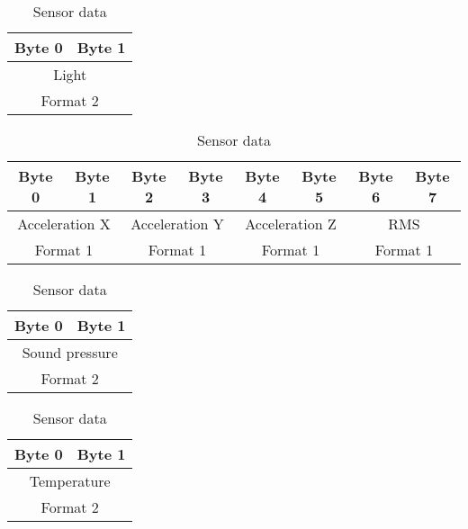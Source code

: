 \begin{table}[H]
    \centering
    {
    \begin{tabular}{|c c|}
        \hline
        \textbf{Byte 0} & \textbf{Byte 1}\\
        \hline
        \hline
        \multicolumn{2}{|c|}{Light}\\
        \multicolumn{2}{|c|}{Format 2}\\
        \hline
    \end{tabular}
    }
    \caption{Sensor data}
    \label{table:sensor6}
\end{table}

\begin{table}[H]
    \centering
    {
    \begin{tabular}{|c c c c c c c c|}
        \hline
        \textbf{Byte 0} & \textbf{Byte 1}  & \textbf{Byte 2} & \textbf{Byte 3} & \textbf{Byte 4} & \textbf{Byte 5} & \textbf{Byte 6} & \textbf{Byte 7}\\
        \hline
        \hline
        \multicolumn{2}{|c|}{Acceleration X} & \multicolumn{2}{|c|}{Acceleration Y}  & \multicolumn{2}{|c|}{Acceleration Z} & \multicolumn{2}{|c|}{RMS}\\
        \multicolumn{2}{|c|}{Format 1} & \multicolumn{2}{|c|}{Format 1}  & \multicolumn{2}{|c|}{Format 1} & \multicolumn{2}{|c|}{Format 1}\\
        \hline
    \end{tabular}
    }
    \caption{Sensor data}
    \label{table:sensor7}
\end{table}

\begin{table}[H]
    \centering
    {
    \begin{tabular}{|c c|}
        \hline
        \textbf{Byte 0} & \textbf{Byte 1}\\
        \hline
        \hline
        \multicolumn{2}{|c|}{Sound pressure}\\
        \multicolumn{2}{|c|}{Format 2}\\
        \hline
    \end{tabular}
    }
    \caption{Sensor data}
    \label{table:sensor8}
\end{table}

\begin{table}[H]
    \centering
    {
    \begin{tabular}{|c c|}
        \hline
        \textbf{Byte 0} & \textbf{Byte 1}\\
        \hline
        \hline
        \multicolumn{2}{|c|}{Temperature}\\
        \multicolumn{2}{|c|}{Format 2}\\
        \hline
    \end{tabular}
    }
    \caption{Sensor data}
    \label{table:sensor9}
\end{table}

